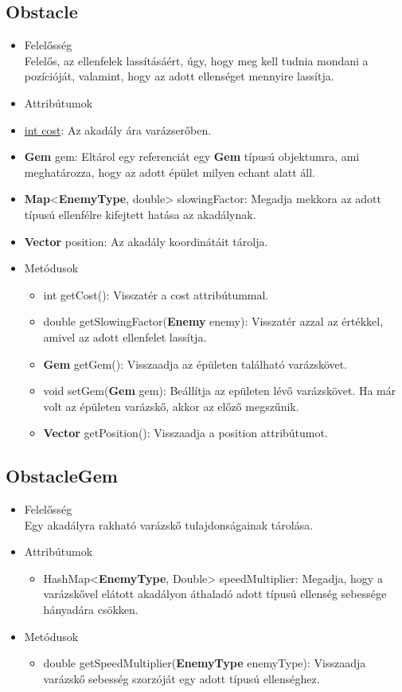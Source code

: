 \subsection{Obstacle}
\begin{itemize}
\item Felelősség\\
Felelős, az ellenfelek lassításáért, úgy, hogy meg kell tudnia mondani a pozícióját, valamint, hogy az adott ellenséget mennyire lassítja.
\item Attribútumok
		\item \underline{int cost}: Az akadály ára varázserőben.
		\item \textbf{Gem} gem: Eltárol egy referenciát egy \textbf{Gem} típusú objektumra, ami meghatározza, hogy az adott épület milyen echant alatt áll.
		\item \textbf{Map}<\textbf{EnemyType}, double> slowingFactor: Megadja mekkora az adott típusú ellenfélre kifejtett hatása az akadálynak.
		\item \textbf{Vector} position: Az akadály koordinátáit tárolja.
\item Metódusok
	\begin{itemize}
		\item int getCost(): Visszatér a cost attribútummal.
		\item double getSlowingFactor(\textbf{Enemy} enemy): Visszatér azzal az értékkel, amivel az adott ellenfelet lassítja.
		\item \textbf{Gem} getGem(): Visszaadja az épületen található varázskövet.
		\item void setGem(\textbf{Gem} gem): Beállítja az epületen lévő varázskövet. Ha már volt az épületen varázskő, akkor az előző megszűnik.
		\item \textbf{Vector} getPosition(): Visszaadja a position attribútumot.
	\end{itemize}
\end{itemize}


\subsection{ObstacleGem}
\begin{itemize}
\item Felelősség\\
Egy akadályra rakható varázskő tulajdonságainak tárolása.
\item Attribútumok
	\begin{itemize}
		\item HashMap<\textbf{EnemyType}, Double> speedMultiplier: Megadja, hogy a varázskővel elátott akadályon áthaladó adott típusú ellenség sebessége hányadára csökken.
	\end{itemize}
\item Metódusok
	\begin{itemize}
		\item double getSpeedMultiplier(\textbf{EnemyType} enemyType): Visszaadja varázskő sebesség szorzóját egy adott típusú ellenséghez.
	\end{itemize}
\end{itemize}


